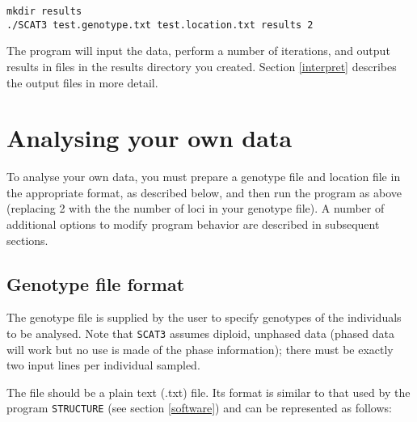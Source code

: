 \documentclass[10pt,titlepage,times,letterpaper]{article}
\def\SCAT{{\tt SCAT3} }
\begin{document}
{\flushleft
\tt{mkdir results}  \\
{\tt ./SCAT3 test.genotype.txt test.location.txt results 2} \\
}

\medskip

The program will input the data, perform a number of iterations, and
output results in files in the results directory you created. 
Section \ref{interpret} describes the output files in more detail.

\section{Analysing your own data}

To analyse your own data, you must prepare a genotype file and
location file in the appropriate format, as described below, and then
run the program as above (replacing 2 with the 
the number of loci in your genotype file). A number of additional options
to modify program behavior are described in subsequent sections.

\subsection{Genotype file format} \label{inputfile}

The genotype file is supplied by the user to specify genotypes of the
individuals to be analysed.   Note that \SCAT assumes diploid, unphased
data (phased data will work but no use is made of the phase information);
there must be exactly two input lines per individual sampled.

The file should be a plain text (.txt) file.
Its format is similar to that
used by the program {\tt STRUCTURE} (see section \ref{software})
and can be represented as follows:
\end{document}
